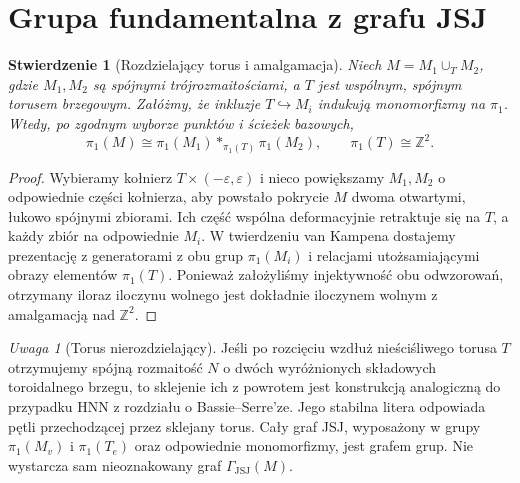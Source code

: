 \documentclass[11pt,a4paper]{report}
\numberwithin{equation}{section}
\theoremstyle{plain}
\newtheorem{stwierdzenie}[twierdzenie]{Stwierdzenie}
\theoremstyle{definition}
\theoremstyle{remark}
\newtheorem{uwaga}[twierdzenie]{Uwaga}
\begin{document}
\begin{center}
\end{center}

\section{Grupa fundamentalna z grafu JSJ}
\label{sec:tg-jsj-groups}

\begin{stwierdzenie}[Rozdzielający torus i amalgamacja]
Niech $M=M_1\cup_T M_2$, gdzie $M_1,M_2$ są
spójnymi trójrozmaitościami, a $T$ jest wspólnym,
spójnym torusem brzegowym. Załóżmy, że inkluzje
$T\hookrightarrow M_i$ indukują monomorfizmy na
$\pi_1$. Wtedy, po zgodnym wyborze punktów i ścieżek
bazowych,
\[
\pi_1(M)\cong\pi_1(M_1)
 *_{\pi_1(T)}\pi_1(M_2),
\qquad \pi_1(T)\cong\mathbb Z^2.
\]
\end{stwierdzenie}
\begin{proof}
Wybieramy kołnierz $T\times(-\varepsilon,\varepsilon)$
i nieco powiększamy $M_1,M_2$ o odpowiednie części
kołnierza, aby powstało pokrycie $M$ dwoma
otwartymi, łukowo spójnymi zbiorami. Ich część
wspólna deformacyjnie retraktuje się na $T$, a
każdy zbiór na odpowiednie $M_i$. W twierdzeniu
van Kampena dostajemy prezentację z generatorami
z obu grup $\pi_1(M_i)$ i relacjami utożsamiającymi
obrazy elementów $\pi_1(T)$. Ponieważ założyliśmy
injektywność obu odwzorowań, otrzymany iloraz
iloczynu wolnego jest dokładnie iloczynem wolnym
z amalgamacją nad $\mathbb Z^2$.
\end{proof}

\begin{uwaga}[Torus nierozdzielający]
Jeśli po rozcięciu wzdłuż nieściśliwego torusa
$T$ otrzymujemy spójną rozmaitość $N$ o dwóch
wyróżnionych składowych toroidalnego brzegu,
to sklejenie ich z powrotem jest konstrukcją
analogiczną do przypadku HNN z rozdziału o
Bassie--Serre'ze. Jego stabilna litera odpowiada
pętli przechodzącej przez sklejany torus.
Cały graf JSJ, wyposażony w grupy
$\pi_1(M_v)$ i $\pi_1(T_e)$ oraz odpowiednie
monomorfizmy, jest grafem grup. Nie wystarcza
sam nieoznakowany graf $\Gamma_{\mathrm{JSJ}}(M)$.
\end{uwaga}
\end{document}
